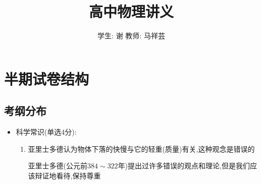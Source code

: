 \documentclass{article}
\title{高中物理讲义}
\author{学生: 谢 \quad 教师: 马祥芸}
\begin{document}
\maketitle
\tableofcontents
\newpage
{}

\section{半期试卷结构}
\subsection{考纲分布}
\begin{itemize}
    \item 科学常识(单选4分):

          \begin{enumerate}
              \item 亚里士多德认为物体下落的快慢与它的轻重(质量)有关,这种观念是错误的

                    \vspace{-1em}

                    \hspace{-1em}\begin{adjustbox}{minipage=0.91\linewidth, bgcolor=gray!20, padding=1em}
                        \small %
                        亚里士多德(公元前$384\sim322$年)提出过许多错误的观点和理论,但是我们应该辩证地看待,保持尊重
                    \end{adjustbox}

                    \vspace{-1em}


\end{enumerate}
\end{itemize}
\end{document}
